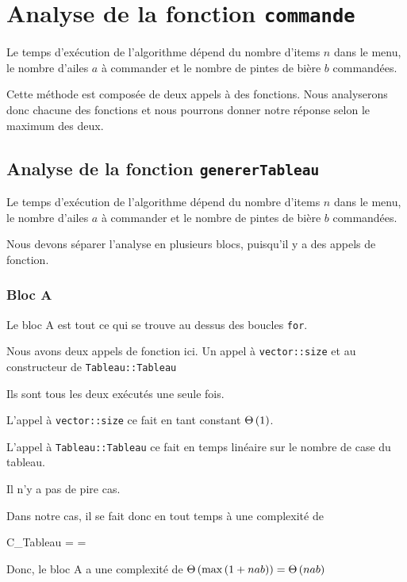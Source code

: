 \documentclass[class=article]{standalone}
\begin{document}
\section*{Analyse de la fonction \lstinline{commande}}

Le temps d'exécution de l'algorithme dépend du nombre d'items $n$ dans le menu,
le nombre d'ailes $a$ à commander et le nombre de pintes de bière $b$ commandées.

Cette méthode est composée de deux appels à des fonctions. Nous analyserons donc
chacune des fonctions et nous pourrons donner notre réponse selon le maximum des deux.

\subsection*{Analyse de la fonction \lstinline{genererTableau} }

Le temps d'exécution de l'algorithme dépend du nombre d'items $n$ dans le menu,
le nombre d'ailes $a$ à commander et le nombre de pintes de bière $b$ commandées.

Nous devons séparer l'analyse en plusieurs blocs, puisqu'il y a des appels de fonction.

\subsubsection*{Bloc A}

Le bloc A est tout ce qui se trouve au dessus des boucles \lstinline{for}.

Nous avons deux appels de fonction ici. Un appel à \lstinline{vector::size} et au constructeur
de \lstinline{Tableau::Tableau}

Ils sont tous les deux exécutés une seule fois.

L'appel à \lstinline{vector::size} ce fait en tant constant $\Theta\left ( 1 \right )$.

L'appel à \lstinline{Tableau::Tableau} ce fait en temps linéaire sur le nombre de case du tableau.

Il n'y a pas de pire cas.

Dans notre cas, il se fait donc en tout temps à une complexité de
\begin{deriv}
C_{Tableau}
\<\in
\Theta{}
\<= 
\Theta{} 
\<= 
\Theta{} 
\end{deriv}

Donc, le bloc A a une complexité de $\Theta\left ( \max\left ( 1 + nab \right ) \right ) = \Theta\left ( nab \right )$
\end{document}
